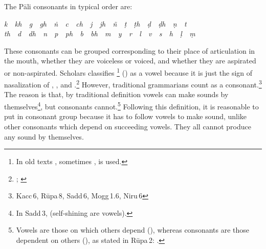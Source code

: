 The P\=ali consonants in typical order are:

\begin{center}
\large \itshape k\ \ kh\ \ g\ \ gh\ \ \.n\ \ c\ \ ch\ \ j\ \ jh\ \ \~n\ \ \d t\ \ \d th\ \ \d d\ \ \d dh\ \ \d n\ \ t\ \ \\th\ \ d\ \ dh\ \ n\ \ p\ \ ph\ \ b\ \ bh\ \ m\ \ y\ \ r\ \ l\ \ v\ \ s\ \ h\ \ \d l\ \ \d m
\end{center}

These consonants can be grouped corresponding to their place of articulation in the mouth, whether they are voiceless or voiced, and whether they are aspirated or non-aspirated. Scholars classifies \footnote{In old texts \pali{\ng}, sometimes , is used.} () as a vowel because it is just the sign of nasalization of , , and .\footnote{\citealp[p.~2]{geiger:grammar}; \citealp[p.~1]{collins:grammar}} However, traditional grammarians count  as a consonant.\footnote{Kacc\,6, R\=upa\,8, Sadd\,6, Mogg\,1.6, Niru\,6} The reason is that, by traditional definition vowels can make sounds by themselves\footnote{In Sadd\,3,  (self-shining are vowels).}, but consonants cannot.\footnote{Vowels are those on which others depend (), whereas consonants are those dependent on others (), as stated in R\=upa\,2: .} Following this definition, it is reasonable to put  in consonant group because it has to follow vowels  to make sound, unlike other consonants which depend on succeeding vowels. They all cannot produce any sound by themselves.

